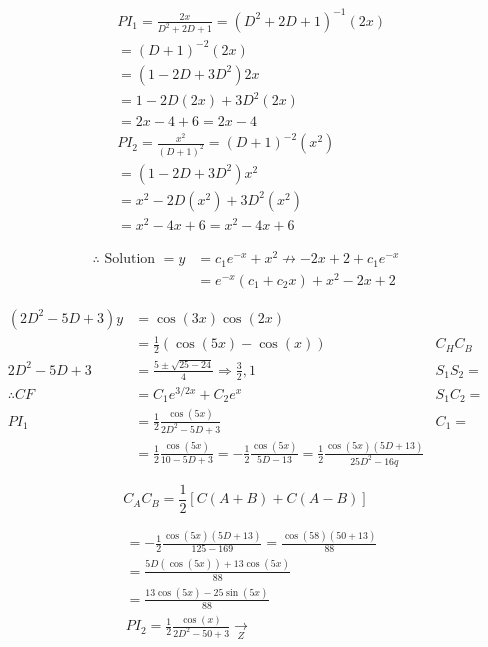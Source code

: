 \documentclass[12pt, a4paper]{article}
\begin{document}
$$
\begin{aligned}
& P I_{1}=\frac{2 x}{D^{2}+2 D+1}=\left(D^{2}+2 D+1\right)^{-1}(2 x) \\
& =(D+1)^{-2}(2 x) \\
& =\left(1-2 D+3 D^{2}\right) 2 x \\
& =1-2 D(2 x)+3 D^{2}(2 x) \\
& =2 x-4+6=2 x-4 \\
& P I_{2}=\frac{x^{2}}{(D+1)^{2}}=(D+1)^{-2}\left(x^{2}\right) \\
& =\left(1-2 D+3 D^{2}\right) x^{2} \\
& =x^{2}-2 D\left(x^{2}\right)+3 D^{2}\left(x^{2}\right) \\
& =x^{2}-4 x+6=x^{2}-4 x+6
\end{aligned}
$$

$$
\begin{aligned}
\therefore \text { Solution }=y & =c_{1} e^{-x}+x^{2} \nrightarrow-2 x+2+c_{1} e^{-x} \\
& =e^{-x}\left(c_{1}+c_{2} x\right)+x^{2}-2 x+2
\end{aligned}
$$

$$
\begin{array}{rlr}
\left(2 D^{2}-5 D+3\right) y & =\cos (3 x) \cos (2 x) & \\
& =\frac{1}{2}(\cos (5 x)-\cos (x)) & C_{H} C_{B} \\
2 D^{2}-5 D+3 & =\frac{5 \pm \sqrt{25-24}}{4} \Rightarrow \frac{3}{2}, 1 & S_{1} S_{2}= \\
\therefore C F & =C_{1} e^{3 / 2 x}+C_{2} e^{x} & S_{1} C_{2}= \\
P I_{1} & =\frac{1}{2} \frac{\cos (5 x)}{2 D^{2}-5 D+3} & C_{1}= \\
& =\frac{1}{2} \frac{\cos (5 x)}{10-5 D+3}=-\frac{1}{2} \frac{\cos (5 x)}{5 D-13}=\frac{1}{2} \frac{\cos (5 x)(5 D+13)}{25 D^{2}-16 q}
\end{array}
$$

$$
C_{A} C_{B}=\frac{1}{2}[C(A+B)+C(A-B)]
$$

$$
\begin{aligned}
&=-\frac{1}{2} \frac{\cos (5 x)(5 D+13)}{125-169}=\frac{\cos (58)(50+13)}{88} \\
&=\frac{5 D(\cos (5 x))+13 \cos (5 x)}{88} \\
&=\frac{13 \cos (5 x)-25 \sin (5 x)}{88} \\
& P I_{2}=\frac{1}{2} \frac{\cos (x)}{2 D^{2}-50+3} \xrightarrow[Z]{ }
\end{aligned}
$$
\end{document}
